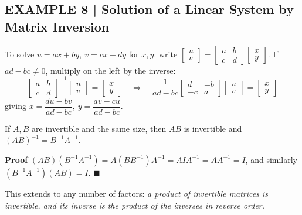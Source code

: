 \documentclass{article}
\theoremstyle{mystyle}
\begin{document}
\subsection*{EXAMPLE 8 | Solution of a Linear System by Matrix Inversion}
To solve $u=ax+by,\ v=cx+dy$ for $x,y$: write $\begin{bmatrix}u\\v\end{bmatrix}=\begin{bmatrix}a&b\\c&d\end{bmatrix}\begin{bmatrix}x\\y\end{bmatrix}$. If $ad-bc\ne0$, multiply on the left by the inverse:
\[
\begin{bmatrix}a&b\\c&d\end{bmatrix}^{-1}\begin{bmatrix}u\\v\end{bmatrix}=\begin{bmatrix}x\\y\end{bmatrix}
\quad\Longrightarrow\quad
\frac{1}{ad-bc}\begin{bmatrix}d&-b\\-c&a\end{bmatrix}\begin{bmatrix}u\\v\end{bmatrix}=\begin{bmatrix}x\\y\end{bmatrix}
\]
giving $x=\dfrac{du-bv}{ad-bc},\ y=\dfrac{av-cu}{ad-bc}$.

\begin{tcolorbox}[colback=red!4, colframe=red!60!black, title=Theorem 1.4.6, boxrule=0.5mm, arc=3mm]
If $A,B$ are invertible and the same size, then $AB$ is invertible and $(AB)^{-1}=B^{-1}A^{-1}$.
\end{tcolorbox}
\textbf{Proof} $(AB)(B^{-1}A^{-1})=A(BB^{-1})A^{-1}=AIA^{-1}=AA^{-1}=I$, and similarly $(B^{-1}A^{-1})(AB)=I$. $\blacksquare$

This extends to any number of factors: \textit{a product of invertible matrices is invertible, and its inverse is the product of the inverses in reverse order.}
\end{document}
